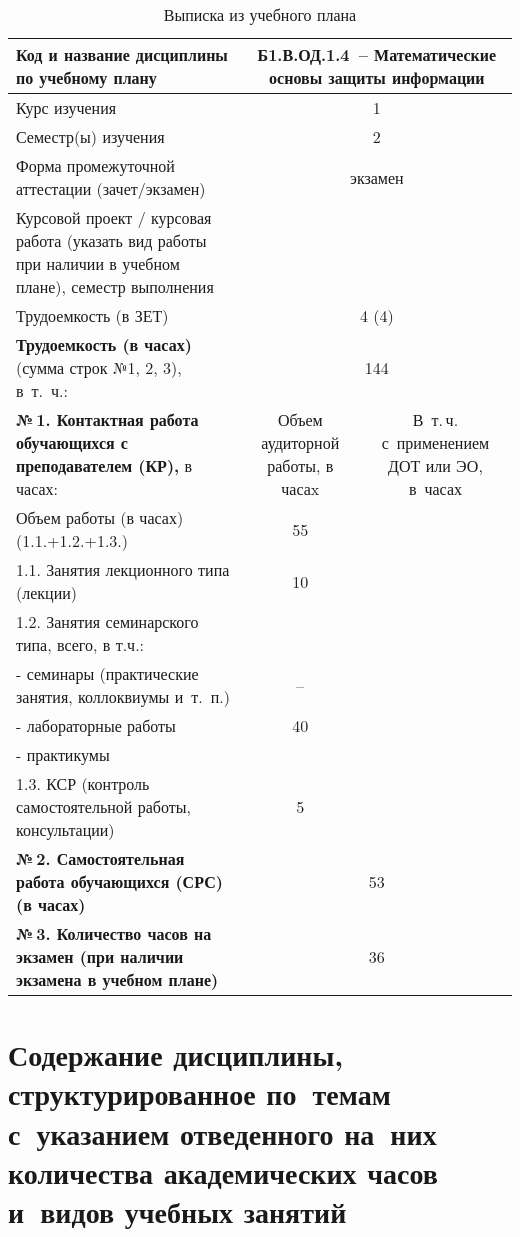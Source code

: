\documentclass[a4paper,12pt]{article}
\begin{document}
\begin{table}[H]
\caption{Выписка из учебного плана} 
\begin{tabular}{|p{9cm}|c|c|}
\hline
Код и название дисциплины по учебному плану & \multicolumn{2}{p{6cm}|}{Б1.В.ОД.1.4\ -- Математические основы защиты информации }\\
\hline
Курс изучения &\multicolumn{2}{c|}{ 1 }\\
\hline
Семестр(ы) изучения &\multicolumn{2}{c|}{ 2 }\\
\hline
Форма промежуточной аттестации (зачет/экзамен) &\multicolumn{2}{c|}{ экзамен }\\
\hline
Курсовой проект / курсовая работа (указать вид работы при наличии в учебном плане), семестр выполнения &\multicolumn{2}{c|}{ }\\
\hline
Трудоемкость (в ЗЕТ) &\multicolumn{2}{c|}{ 4 (4) }\\
\hline
{\bf Трудоемкость (в часах)} (сумма строк №1, 2, 3), в~т.~ч.:& \multicolumn{2}{c|}{144}\\
\hline
\textbf{№\,1. Контактная работа обучающихся с преподавателем (КР),} в часах:
& \multicolumn{1}{p{3cm}|}{\centering Объем аудиторной работы, в часаx}
& \multicolumn{1}{p{3cm}|}{\centering\arraybackslash В~т.\,ч. с~применением ДОТ или ЭО, в~часах}\\
\hline  
Объем работы (в часах) (1.1.+1.2.+1.3.)& 55 & \\
\hline
1.1. Занятия лекционного типа (лекции) & 10 & \\
\hline
1.2. Занятия семинарского типа, всего, в т.ч.: & & \\
\hline
- семинары (практические занятия, коллоквиумы и~т.~п.)  & – & \\
\hline
- лабораторные работы& 40 & \\
\hline
- практикумы & & \\
\hline
1.3. КСР (контроль самостоятельной работы, консультации)& 5 & \\
\hline
{\bf №\,2. Самостоятельная работа обучающихся (СРС) (в часах)}& \multicolumn{2}{c|}{53}\\
\hline
{\bf №\,3. Количество часов на экзамен (при наличии экзамена в учебном плане)}& \multicolumn{2}{c|}{36}\\
\hline
\end{tabular}
\end{table}



\newpage
\section{Содержание дисциплины, структурированное по~темам с~указанием отведенного на~них количества академических часов и~видов учебных занятий}
\end{document}
